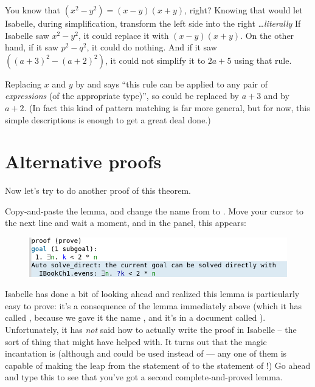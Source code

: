 You know that $(x^2 - y^2) = (x-y)(x+y)$, right? Knowing that would let Isabelle, during simplification, transform the left side into the right \ldots \textit{literally}  If Isabelle saw $x^2 - y^2$, it could replace it with $(x-y)(x+y)$. On the other hand, if it saw $p^2 - q^2$, it could do nothing. And if it saw $((a+3)^2 - (a+2)^2)$, it could not simplify it to $2a + 5$ using that rule. 

Replacing $x$ and $y$ by  and  says ``this rule can be applied to any pair of \textit{expressions} (of the appropriate type)'', so  could be replaced by $a+3$ and  by $a+2$. (In fact this kind of pattern matching is far more general, but for now, this simple descriptions is enough to get a great deal done.)

\section{Alternative proofs}
Now let's try to do another proof of this theorem. 

\task Copy-and-paste the lemma, and change the name from  to . Move your cursor to the next line and wait a moment, and in the  panel, this appears:

\begin{figure}[h]
    \includegraphics[width=1\linewidth]{C01/Images/auto-proof.png}
\end{figure}

Isabelle has done a bit of looking ahead and realized this lemma is particularly easy to prove: it's a consequence of the lemma immediately above (which it has called , because we gave it the name , and it's in a document called ). Unfortunately, it has \textit{not} said how to actually write the proof in Isabelle -- the sort of thing that  might have helped with. It turns out that the magic incantation is  (although  and  could be used instead of  --- any one of them is capable of making the leap from the statement of  to the statement of !) Go ahead and type this to see that you've got a second complete-and-proved lemma.
\etask 

